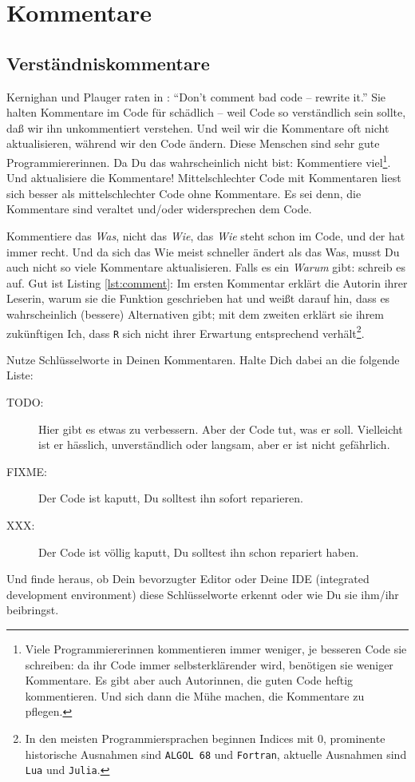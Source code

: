 \documentclass[twoside]{scrreprt}
\providecommand{\R}{\texttt{R}}
\begin{document}
\section{Kommentare}
\subsection{Verst\"a{}ndniskommentare\label{sec:compcom}}
Kernighan und Plauger raten in \cite{KP}:
"`Don't comment bad code -- rewrite it."'
Sie halten Kommentare im Code f\"u{}r sch\"a{}dlich  --
weil Code so verst\"a{}ndlich sein sollte, da\ss{} wir ihn unkommentiert
verstehen.
Und weil wir die Kommentare oft nicht aktualisieren, w\"a{}hrend wir den Code
\"a{}ndern.
Diese Menschen sind sehr gute Programmiererinnen.
Da Du das wahrscheinlich nicht bist:
Kommentiere viel\footnote{Viele Programmiererinnen kommentieren immer weniger,
    je besseren Code sie schreiben: da ihr Code immer selbsterkl\"a{}render
    wird, ben\"o{}tigen sie weniger Kommentare. Es gibt aber auch Autorinnen,
    die guten Code heftig kommentieren. Und sich dann die M\"u{}he machen, die
    Kommentare zu pflegen.
}.
Und aktualisiere die Kommentare!
Mittelschlechter Code mit Kommentaren liest sich besser als mittelschlechter 
Code ohne Kommentare. Es sei denn, die Kommentare sind veraltet und/oder
widersprechen dem Code.

Kommentiere das \emph{Was}, nicht das \emph{Wie}, das \emph{Wie} steht schon im
Code, und der hat immer recht.
Und da sich das Wie meist schneller \"a{}ndert als das Was, musst Du auch
nicht so viele Kommentare aktualisieren.
Falls es ein \emph{Warum} gibt: schreib es auf.
Gut ist  Listing \ref{lst:comment}: Im ersten Kommentar erkl\"a{}rt die Autorin
ihrer Leserin, warum sie die Funktion geschrieben hat und wei\ss{}t darauf hin,
dass es wahrscheinlich (bessere) Alternativen gibt; mit dem zweiten
erkl\"a{}rt sie ihrem zuk\"u{}nftigen Ich, dass \R{} sich nicht ihrer Erwartung
entsprechend verh\"a{}lt\footnote{In den meisten Programmiersprachen beginnen
    Indices mit 0, prominente historische Ausnahmen sind \texttt{ALGOL 68} und
    \texttt{Fortran}, aktuelle Ausnahmen sind \texttt{Lua} und \texttt{Julia}.}.


Nutze Schl\"u{}sselworte in Deinen Kommentaren. Halte Dich dabei an die folgende
Liste:
\begin{description}
\item[TODO:] Hier gibt es etwas zu verbessern. Aber der Code tut, was er soll.
  Vielleicht ist er h\"a{}sslich, 
  unverst\"a{}ndlich oder langsam,
  aber er ist nicht gef\"a{}hrlich.
\item[FIXME:] Der Code ist kaputt, Du solltest ihn sofort reparieren.
\item[XXX:] Der Code ist v\"o{}llig kaputt, Du solltest ihn schon repariert
    haben.
\end{description}
Und finde heraus, ob Dein bevorzugter Editor oder Deine IDE (integrated
development environment) diese Schl\"u{}sselworte erkennt oder wie Du sie
ihm/ihr beibringst.
\end{document}
